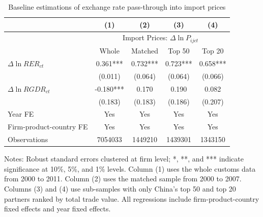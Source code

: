 \begin{table}[htbp]
	\centering
	\caption{Baseline estimations of exchange rate pass-through into import prices}
	\begin{threeparttable}
		\begin{tabular}{lcccc}
			\toprule
			& (1)   & (2)   & (3)   & (4) \\
			\midrule
			& \multicolumn{4}{c}{Import Prices: $\Delta \ln P_{ijct}$} \\
			& Whole & Matched & Top 50 & Top 20 \\
			\midrule
			$\Delta \ln RER_{ct}$ & 0.361*** & 0.732*** & 0.723*** & 0.658*** \\
			& (0.011) & (0.064) & (0.064) & (0.066) \\
			$\Delta \ln RGDR_{ct}$ & -0.180*** & 0.170 & 0.190 & 0.082 \\
			& (0.183) & (0.183) & (0.186) & (0.207) \\
			Year FE  & Yes   & Yes   & Yes   & Yes \\
			Firm-product-country FE & Yes   & Yes   & Yes   & Yes \\
			Observations & 7054033 & 1449210 & 1439301 & 1343150 \\
			\bottomrule
		\end{tabular}
		\begin{tablenotes}
			\footnotesize
			\item[Notes:] Robust standard errors clustered at firm level;  *, **, and *** indicate significance at 10\%, 5\%, and 1\% levels. Column (1) uses the whole customs data from 2000 to 2011. Column (2) uses the matched sample from 2000 to 2007. Columns (3) and (4) use sub-samples with only China's top 50 and top 20 partners ranked by total trade value. All regressions include firm-product-country fixed effects and year fixed effects. 
		\end{tablenotes}
	\end{threeparttable}
	\label{tab.baseline}
\end{table}

